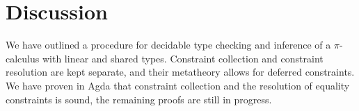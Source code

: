\documentclass[sigplan,screen,review]{acmart}
\newcommand{\picalc}{$\pi$-calculus}
\begin{document}
\section{Discussion}

We have outlined a procedure for decidable type checking and inference of a \picalc{} with linear and shared types.
Constraint collection and constraint resolution are kept separate, and their metatheory allows for deferred constraints.
We have proven in Agda that constraint collection and the resolution of equality constraints is sound, the remaining proofs are still in progress.



\end{document}
